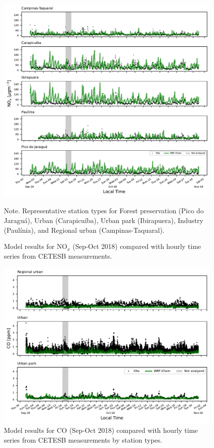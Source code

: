 \begin{figure}[hbt]
  \begin{center}
  	\includegraphics[width=1\textwidth]{fig/Sep_Oct18_station_subplot_nox}
  \end{center}
  \caption{Model results for NO$_x$ (Sep-Oct 2018) compared with hourly time series from CETESB measurements.}
  {\scriptsize Note. Representative station types for Forest preservation (Pico do Jaragu\'{a}), Urban (Carapicu\'{i}ba), Urban park (Ibirapuera), Industry (Paulínia), and Regional urban (Campinas-Taquaral).}
\end{figure}

\begin{figure}[hbt]
  \centering
  \includegraphics{fig/Sep_Oct18_type_subplot_co}
  \caption{Model results for CO (Sep-Oct 2018) compared with hourly time series from CETESB measurements by station types.}
\end{figure}

